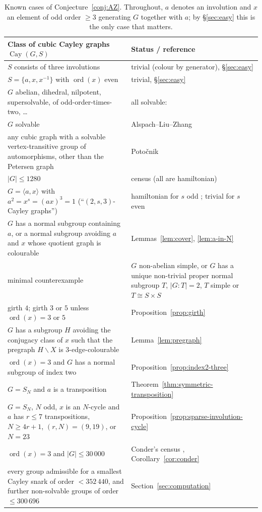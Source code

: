 \documentclass[11pt,a4paper]{article}
\theoremstyle{definition}
\theoremstyle{remark}
\newcommand{\Cay}{\operatorname{Cay}}
\newcommand{\ord}{\operatorname{ord}}
\begin{document}
\begin{table}[ht]
\centering
\small
\begin{tabular}{@{}p{}p{}@{}}
\toprule
Class of cubic Cayley graphs $\Cay(G,S)$ & Status / reference\\
\midrule
$S$ consists of three involutions & trivial (colour by generator), \S\ref{sec:easy}\\
$S=\{a,x,x^{-1}\}$ with $\ord(x)$ even & trivial, \S\ref{sec:easy}\\
$G$ abelian, dihedral, nilpotent, supersolvable, of odd-order-times-two, \dots & all solvable: \cite{ALZ96}\\
$G$ solvable & Alspach--Liu--Zhang \cite{ALZ96}\\
any cubic graph with a solvable vertex-transitive group of automorphisms, other than the Petersen graph & Poto\v{c}nik \cite{Potocnik04}\\
$|G|\le 1280$ & census \cite{PSV13} (all are hamiltonian)\\
$G=\langle a,x\rangle$ with $a^2=x^s=(ax)^3=1$ (``$(2,s,3)$-Cayley graphs'') & hamiltonian for $s$ odd \cite{GM07,GKMM12}; trivial for $s$ even\\
$G$ has a normal subgroup containing $a$, or a normal subgroup avoiding $a$ and $x$ whose quotient graph is colourable & Lemmas~\ref{lem:cover}, \ref{lem:a-in-N}\\
minimal counterexample & $G$ non-abelian simple, or $G$ has a unique non-trivial proper normal subgroup $T$, $|G:T|=2$, $T$ simple or $T\cong S\times S$ \cite{NS01}\\
girth $4$; girth $3$ or $5$ unless $\ord(x)=3$ or $5$ & Proposition~\ref{prop:girth}\\
$G$ has a subgroup $H$ avoiding the conjugacy class of $x$ such that the pregraph $H\backslash X$ is $3$-edge-colourable & Lemma~\ref{lem:pregraph}\\
$\ord(x)=3$ and $G$ has a normal subgroup of index two & Proposition~\ref{prop:index2-three}\\
$G=S_N$ and $a$ is a transposition & Theorem~\ref{thm:symmetric-transposition}\\
$G=S_N$, $N$ odd, $x$ is an $N$-cycle and $a$ has $r\le7$ transpositions, $N\ge4r+1$, $(r,N)=(9,19)$, or $N=23$ & Proposition~\ref{prop:sparse-involution-cycle}\\
$\ord(x)=3$ and $|G|\le 30\,000$ & Conder's census \cite{Conder11}, Corollary~\ref{cor:conder}\\
every group admissible for a smallest Cayley snark of order $<352\,440$, and further non-solvable groups of order $\le 300\,696$ & Section~\ref{sec:computation}\\
\bottomrule
\end{tabular}
\caption{Known cases of Conjecture~\ref{conj:AZ}.  Throughout, $a$ denotes an involution and $x$ an element of odd order $\ge 3$ generating $G$ together with $a$; by \S\ref{sec:easy} this is the only case that matters.}
\label{tab:status}
\end{table}
\end{document}

